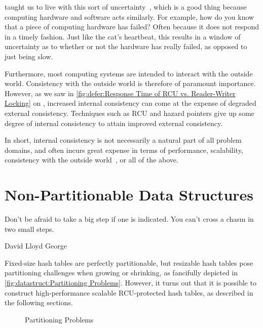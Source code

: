  taught us to live with this sort of
uncertainty~\cite{WeinerHeisenberg1927Uncertain}, which is a good
thing because computing hardware and software acts similarly.
For example, how do you know that a piece of computing hardware
has failed?
Often because it does not respond in a timely fashion.
Just like the cat's heartbeat, this results in a window of
uncertainty as to whether or not the hardware has really failed,
as opposed to just being slow.

Furthermore, most computing systems are intended to interact with
the outside world.
Consistency with the outside world is therefore of paramount importance.
However, as we saw in
\cref{fig:defer:Response Time of RCU vs. Reader-Writer Locking}
on
,
increased internal consistency can come at the expense of degraded
external consistency.
Techniques such as RCU and hazard pointers give up some degree of
internal consistency to attain improved external consistency.

In short, internal consistency is not necessarily a natural part of all
problem domains, and often incurs great expense in terms of performance,
scalability, consistency with the outside
world~\cite{AndreasHaas2012FIFOisnt,AndreasHaas2013CFRelaxedQueues,10.5555/3241639.3241645},
or all of the above.

\section{Non-Partitionable Data Structures}
\label{sec:datastruct:Non-Partitionable Data Structures}
%
\epigraph{Don't be afraid to take a big step if one is indicated.
	  You can't cross a chasm in two small steps.}
	 {David Lloyd George}

Fixed-size hash tables are perfectly partitionable, but resizable hash
tables pose partitioning challenges when growing or shrinking, as
fancifully depicted in
\cref{fig:datastruct:Partitioning Problems}.
However, it turns out that it is possible to construct high-performance
scalable RCU-protected hash tables, as described in the following sections.

\begin{figure}
\centering
{}
\caption{Partitioning Problems}
\end{figure}

